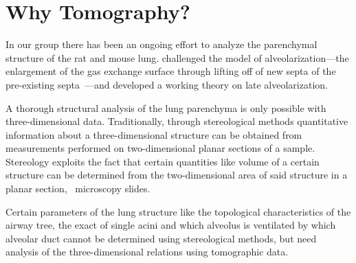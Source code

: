\section{Why Tomography?}
In our group there has been an ongoing effort to analyze the parenchymal structure of the rat and mouse lung. \citet{Mund2008} challenged the model of alveolarization---the enlargement of the gas exchange surface through lifting off of new septa of the pre-existing septa~\cite{Burri1974}---and developed a working theory on late alveolarization. 

A thorough structural analysis of the lung parenchyma is only possible with three-dimensional data. Traditionally, through stereological methods quantitative information about a three-dimensional structure can be obtained from measurements performed on two-dimensional planar sections of a sample. Stereology exploits the fact that certain quantities like volume of a certain structure can be determined from the two-dimensional area of said structure in a planar section, \eg\ microscopy slides.

Certain parameters of the lung structure like the topological characteristics of the airway tree, the exact of single acini and which alveolus is ventilated by which alveolar duct cannot be determined using stereological methods, but need analysis of the three-dimensional relations using tomographic data.